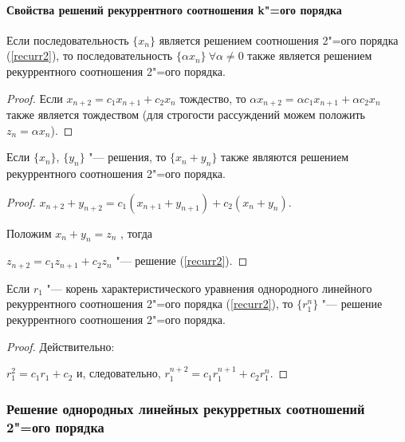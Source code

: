 \paragraph{Свойства решений рекуррентного соотношения k"=ого порядка}

\begin{theorem}
    Если последовательность $\{x_n\}$ является решением
    соотношения 2"=ого порядка (\ref{recurr2}), то последовательность
    $\{ \alpha x_n\} ~ \forall \alpha \neq 0$ также является решением рекуррентного соотношения 2"=ого порядка.

    \begin{proof} 
        Если $ x_{n + 2} =  c_1 x_{n + 1} + c_2 x_n$ тождество, то 
        $\alpha x_{n + 2} = \alpha c_1 x_{n + 1} + \alpha c_2 x_n$ также
        является тождеством (для строгости рассуждений можем
        положить $z_n = \alpha x_n$).
    \end{proof}
    \label{solmult}
\end{theorem}

\begin{theorem}
    Если $\{x_n\}$, $\{y_n\}$ "--- решения, то $\{x_n + y_n\}$
    также являются решением рекуррентного соотношения 2"=ого порядка.

    \begin{proof}
        $x_{n + 2} + y_{n + 2} = c_1(x_{n + 1} + y_{n + 1}) + c_2(x_n + y_n)$.

        Положим $x_n + y_n = z_n$ , тогда 

        $z_{n + 2} = c_1 z_{n + 1} + c_2 z_n$ "--- решение (\ref{recurr2}).
    \end{proof}
    \label{solsummary}
\end{theorem}

\begin{theorem}
    Если $r_1$ "--- корень характеристического уравнения однородного
    линейного рекуррентного соотношения 2"=ого порядка (\ref{recurr2}), то
    $\{ r_1^n\}$ "--- решение рекуррентного соотношения 2"=ого порядка.

    \begin{proof} Действительно:
        
        $r_1^2 = c_1 r_1 + c_2$ и, следовательно, $r_1^{n + 2} = c_1 r_1^{n + 1} + c_2 r_1^{n}$.
    \end{proof}
    \label{xar}
\end{theorem}

\subsubsection{Решение однородных линейных рекурретных
соотношений 2"=ого порядка}


